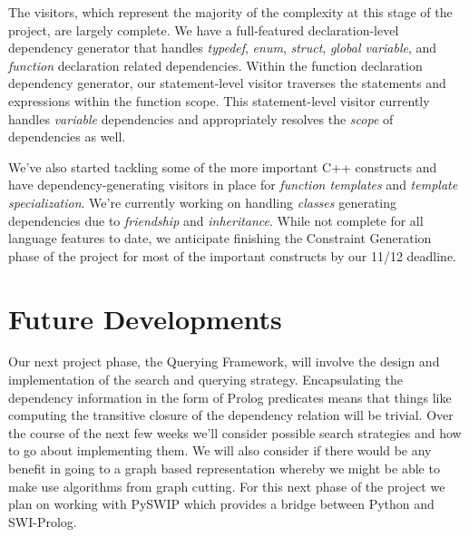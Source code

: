 \documentclass[11pt]{article}
\begin{document}
The visitors, which represent the majority of the complexity at this stage of
the project, are largely complete. We have a full-featured declaration-level
dependency generator that handles \emph{typedef}, \emph{enum}, \emph{struct},
\emph{global variable}, and \emph{function} declaration related
dependencies. Within the function declaration dependency generator, our
statement-level visitor traverses the statements and expressions within the
function scope. This statement-level visitor currently handles \emph{variable}
dependencies and appropriately resolves the \emph{scope} of dependencies as
well.

We've also started tackling some of the more important C++ constructs and have
dependency-generating visitors in place for \emph{function templates} and
\emph{template specialization}. We're currently working on handling
\emph{classes} generating dependencies due to \emph{friendship} and
\emph{inheritance}. While not complete for all language features to date, we
anticipate finishing the Constraint Generation phase of the project for most of
the important constructs by our 11/12 deadline.


\section{Future Developments}

Our next project phase, the Querying Framework, will involve the design and
implementation of the search and querying strategy. Encapsulating the dependency
information in the form of Prolog predicates means that things like computing
the transitive closure of the dependency relation will be trivial. Over the
course of the next few weeks we'll consider possible search strategies and how
to go about implementing them. We will also consider if there would be any
benefit in going to a graph based representation whereby we might be able to
make use algorithms from graph cutting. For this next phase of the project we
plan on working with PySWIP \citep{pyswip} which provides a bridge between
Python and SWI-Prolog.







\end{document}
